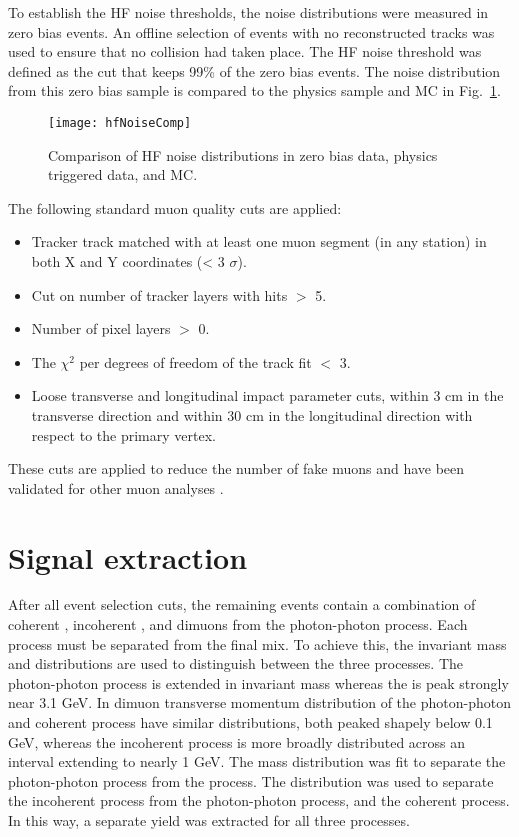       To establish the HF noise thresholds, the noise distributions were 
        measured in zero bias events. 
      An offline selection of events with no reconstructed tracks was used
        to ensure that no collision had taken place. 
      The HF noise threshold was defined as the cut that keeps 99\% of the 
        zero bias events.
      The noise distribution from this zero bias sample is compared to the 
        physics sample and MC in Fig.~\ref{fig:hfNoiseDist}.

      \begin{figure}[!Hhbt]
        \centering
        \texttt{[image: hfNoiseComp]}
        \caption{Comparison of HF noise distributions in zero bias data, 
          physics triggered data, and MC.}
        \label{fig:hfNoiseDist}
      \end{figure}

      The following standard muon quality cuts are applied:
      \begin{itemize}
        \item Tracker track matched with at least one muon segment 
          (in any station) in both X and Y coordinates (< 3 $\sigma$).
        \item Cut on number of tracker layers with hits $>$ 5.
        \item Number of pixel layers $>$ 0.
        \item The $\chi^{2}$ per degrees of freedom of the track fit $<$ 3. 
        \item Loose transverse and longitudinal impact parameter cuts, within 3 
          cm in the transverse direction and within 30 cm in the longitudinal 
          direction with respect to the primary vertex.
      \end{itemize}
      These cuts are applied to reduce the number of fake muons and have been 
        validated for other muon analyses \cite{cmsJpPP}.

  \section{\label{sec:sigEx} Signal extraction}
    After all event selection cuts, the remaining events contain a combination 
      of coherent \JPsi{}, incoherent \JPsi{}, and dimuons from the 
      photon-photon process.
    Each process must be separated from the final mix.
    To achieve this, the invariant mass and \pt{} distributions are used 
      to distinguish between the three processes. 
    The photon-photon process is extended in invariant mass whereas the 
      \JPsi{} is peak strongly near 3.1 GeV.
    In dimuon transverse momentum distribution of the photon-photon and 
      coherent process have similar distributions, both peaked shapely below 
        0.1 GeV, whereas the incoherent process is more broadly distributed 
        across an interval extending to nearly 1 GeV.
    The mass distribution was fit to separate the photon-photon process from
      the \JPsi{} process.
    The \pt{} distribution was used to separate the incoherent process from 
      the photon-photon process, and the coherent process. 
    In this way, a separate yield was extracted for all three processes. 

